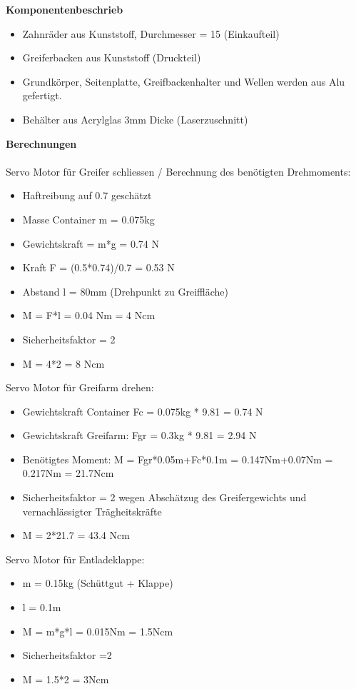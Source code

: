 \textbf{Komponentenbeschrieb}\\[0.2cm]
\begin{itemize}
\item Zahnräder aus Kunststoff, Durchmesser = 15 (Einkaufteil)
\item Greiferbacken aus Kunststoff (Druckteil)
\item Grundkörper, Seitenplatte, Greifbackenhalter und Wellen werden aus Alu gefertigt.
\item Behälter aus Acrylglas 3mm Dicke (Laserzuschnitt)
\end{itemize}
\textbf{Berechnungen}\\[0.2cm]
\\[0.2cm]
Servo Motor für Greifer schliessen /
Berechnung des benötigten Drehmoments: 
\begin{itemize}
\item Haftreibung auf 0.7 geschätzt
\item Masse Container m = 0.075kg
\item Gewichtskraft = m*g = 0.74 N
\item Kraft F = (0.5*0.74)/0.7 = 0.53 N
\item Abstand l = 80mm (Drehpunkt zu Greiffläche)
\item M = F*l = 0.04 Nm = 4 Ncm
\item Sicherheitsfaktor = 2
\item M = 4*2 = 8 Ncm
\end{itemize}
Servo Motor für Greifarm drehen:
\begin{itemize}
\item Gewichtskraft Container Fc = 0.075kg * 9.81 = 0.74 N
\item Gewichtskraft Greifarm: Fgr = 0.3kg * 9.81 = 2.94 N
\item Benötigtes Moment:
M = Fgr*0.05m+Fc*0.1m = 0.147Nm+0.07Nm = 0.217Nm = 21.7Ncm
\item Sicherheitsfaktor = 2 wegen Abschätzug des Greifergewichts und vernachlässigter Trägheitskräfte
\item M = 2*21.7 = 43.4 Ncm
\end{itemize}
Servo Motor für Entladeklappe:
\begin{itemize}
\item m = 0.15kg (Schüttgut + Klappe)
\item l = 0.1m
\item M = m*g*l = 0.015Nm = 1.5Ncm
\item Sicherheitsfaktor =2
\item M = 1.5*2 = 3Ncm
\end{itemize}